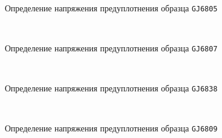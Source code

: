\begin{figure}[ht]
    {\centering
      \small
      \hfill 
      \\
      \hfill  
      \hfill 
      }
      \caption{Определение напряжения предуплотнения образца \texttt{GJ6805}}
      \label{img:6805}
    \end{figure}
    
    \begin{figure}
        {\centering
        \small
          \hfill 
          \\
          \hfill  
          \hfill 
          }
          \caption{Определение напряжения предуплотнения образца \texttt{GJ6807}}
          \label{img:6807}
    \end{figure}
    
    \begin{figure}
        {\centering
        \small
            \hfill 
            \\
            \hfill  
            \hfill 
            }
            \caption{Определение напряжения предуплотнения образца \texttt{GJ6838}}
            \label{img:6838}
    \end{figure}
    
    
    \begin{figure}
        {\centering
        \small
            \hfill 
            \\
            \hfill  
            \hfill 
            }
            \caption{Определение напряжения предуплотнения образца \texttt{GJ6809}}
            \label{img:6809}
    \end{figure}
    
